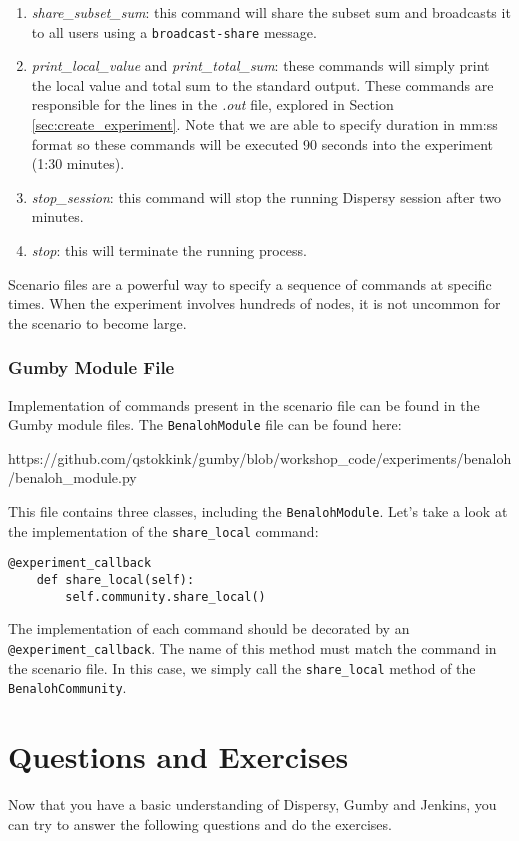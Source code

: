\documentclass{article}
\begin{document}
\begin{enumerate}
	\item \emph{share\_subset\_sum}: this command will share the subset sum and broadcasts it to all users using a \texttt{broadcast-share} message.
	\item \emph{print\_local\_value} and \emph{print\_total\_sum}: these commands will simply print the local value and total sum to the standard output. These commands are responsible for the lines in the \emph{.out} file, explored in Section \ref{sec:create_experiment}. Note that we are able to specify duration in mm:ss format so these commands will be executed 90 seconds into the experiment (1:30 minutes).
	\item \emph{stop\_session}: this command will stop the running Dispersy session after two minutes.
	\item \emph{stop}: this will terminate the running process.
\end{enumerate}

Scenario files are a powerful way to specify a sequence of commands at specific times.
When the experiment involves hundreds of nodes, it is not uncommon for the scenario to become large.

\subsubsection{Gumby Module File}
Implementation of commands present in the scenario file can be found in the Gumby module files.
The \texttt{BenalohModule} file can be found here:

https://github.com/qstokkink/gumby/blob/workshop\_code/experiments/benaloh/benaloh\_module.py

This file contains three classes, including the \texttt{BenalohModule}.
Let's take a look at the implementation of the \texttt{share\_local} command:

\begin{lstlisting}[frame=single]
    @experiment_callback
    def share_local(self):
        self.community.share_local()
\end{lstlisting}

The implementation of each command should be decorated by an \texttt{@experiment\_callback}.
The name of this method must match the command in the scenario file.
In this case, we simply call the \texttt{share\_local} method of the \texttt{BenalohCommunity}.

\section{Questions and Exercises}
Now that you have a basic understanding of Dispersy, Gumby and Jenkins, you can try to answer the following questions and do the exercises.
\end{document}

